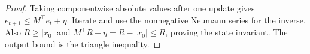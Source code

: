 \begin{proof}
Taking componentwise absolute values after one update gives
$e_{t+1}\le M^\top e_t+\eta$. Iterate and use the nonnegative Neumann
series for the inverse. Also $R\ge|x_0|$ and
$M^\top R+\eta=R-|x_0|\le R$, proving the state invariant.
The output bound is the triangle inequality.
\end{proof}
